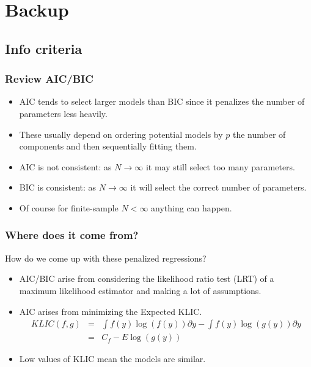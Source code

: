 \begin{frame}[allowframebreaks]
    
    
\end{frame}

\section*{Backup}
\subsection*{Info criteria}\label{sec:info}


\begin{frame}
    \frametitle{Review AIC/BIC}
    \begin{itemize}
    \item AIC tends to select larger models than BIC since it penalizes the number of parameters less heavily.
    \item These usually depend on ordering potential models by $p$ the number of components and then sequentially fitting them.
    \item AIC is not consistent: as $N \rightarrow \infty$ it may still select too many parameters.
    \item BIC is consistent: as $N \rightarrow \infty$ it will select the correct number of parameters.
    \item Of course for finite-sample $N < \infty$ anything can happen.
    \end{itemize}
\end{frame}
    
\begin{frame}
    \frametitle{Where does it come from?}
    How do we come up with these penalized regressions?
    \begin{itemize}
    \item AIC/BIC arise from considering the likelihood ratio test (LRT) of a maximum likelihood estimator and making a lot of assumptions.
    \item AIC arises from minimizing the Expected KLIC.
    \begin{eqnarray*}
    KLIC(f,g) &=& \int  f(y) \log(f(y)) \partial y - \int  f(y) \log(g(y)) \partial y  \\
    &=& C_f - E  \log(g(y))
    \end{eqnarray*}
    \item Low values of KLIC mean the models are similar.
    \end{itemize}
\end{frame}
    
